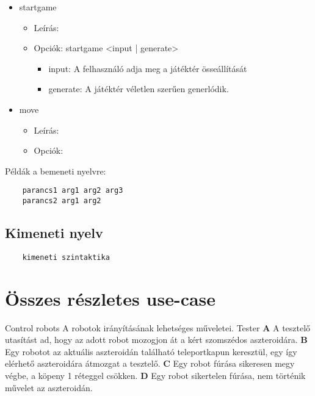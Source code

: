 \documentclass[../../projlab]{subfiles}
\begin{document}
\begin{itemize}
    \item startgame
    \begin{itemize}
        \item Leírás: 
        \item Opciók: startgame <input | generate>
        \begin{itemize}
            \item input: A felhasználó adja meg a játéktér össeállítását
            \item generate: A játéktér véletlen szerűen generlódik.
        \end{itemize}
    \end{itemize}
    \item move
    \begin{itemize}
        \item Leírás: 
        \item Opciók: 
    \end{itemize}
\end{itemize}
Példák a bemeneti nyelvre:
\begin{verbatim}
    parancs1 arg1 arg2 arg3
    parancs2 arg1 arg2
\end{verbatim}


\subsection{Kimeneti nyelv}
\begin{verbatim}
    kimeneti szintaktika
\end{verbatim}

\section{Összes részletes use-case}
\begin{use-case}
    {Control robots}
    {A robotok irányításának lehetséges műveletei. }
    {Tester} 
    \textbf{A} A tesztelő utasítást ad, hogy az adott robot mozogjon át a kért szomszédos aszteroidára.\newline
    \textbf{B} Egy robotot az aktuális aszteroidán található teleportkapun keresztül, egy így elérhető aszteroidára átmozgat a tesztelő. \newline
    \textbf{C} Egy robot fúrása sikeresen megy végbe, a köpeny 1 réteggel csökken. \newline
    \textbf{D} Egy robot sikertelen fúrása, nem történik művelet az aszteroidán. \newline

\end{use-case}
\end{document}
